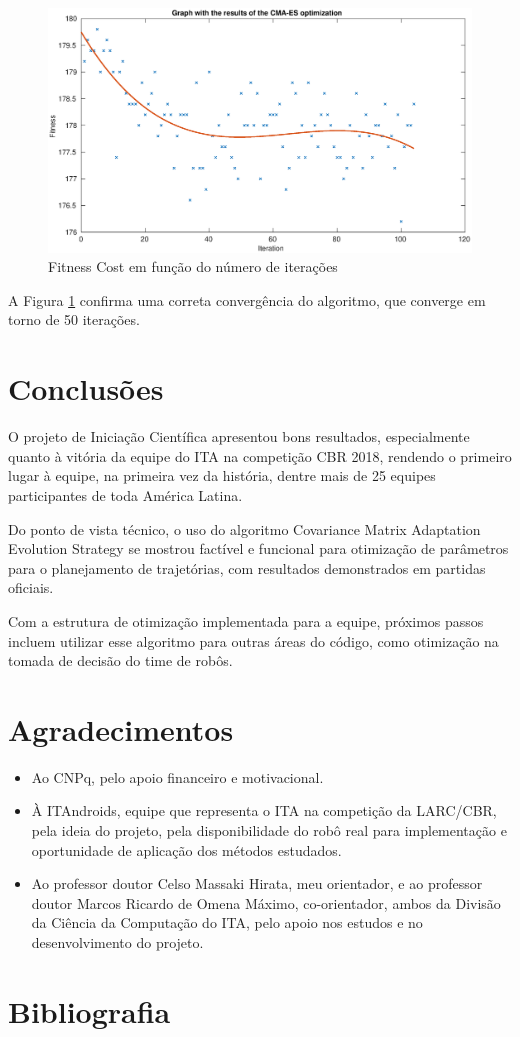 \documentclass[a4paper,12pt]{article}
\begin{document}
\begin{figure}[H]
	\centering
	\includegraphics[width=1.0\textwidth]{figures/CMA-ES_Fitness_Results_ally.eps}
	\caption{Fitness Cost em função do número de iterações}
	\label{fig:fitness_trajetoria_basica_ally}
\end{figure}

A Figura \ref{fig:fitness_trajetoria_basica_ally} confirma uma correta convergência do algoritmo, que converge em torno de 50 iterações.

\section{Conclusões}

O projeto de Iniciação Científica apresentou bons resultados, especialmente quanto à vitória da equipe do ITA na competição CBR 2018, rendendo o primeiro lugar à equipe, na primeira vez da história, dentre mais de 25 equipes participantes de toda América Latina.

Do ponto de vista técnico, o uso do algoritmo Covariance Matrix Adaptation Evolution Strategy se mostrou factível e funcional para otimização de parâmetros para o planejamento de trajetórias, com resultados demonstrados em partidas oficiais.

Com a estrutura de otimização implementada para a equipe, próximos passos incluem utilizar esse algoritmo para outras áreas do código, como otimização na tomada de decisão do time de robôs.

\section{Agradecimentos}

\begin{itemize}
\item Ao CNPq, pelo apoio financeiro e motivacional.
\item À ITAndroids, equipe que representa o ITA na competição da LARC/CBR, pela ideia do projeto, pela disponibilidade do robô real para implementação e oportunidade de aplicação dos métodos estudados.
\item Ao professor doutor Celso Massaki Hirata, meu orientador, e ao professor doutor Marcos Ricardo de Omena Máximo, co-orientador, ambos da Divisão da Ciência da Computação do ITA, pelo apoio nos estudos e no desenvolvimento do projeto.

\end{itemize}

\section{Bibliografia}

\printbibliography
\end{document}
